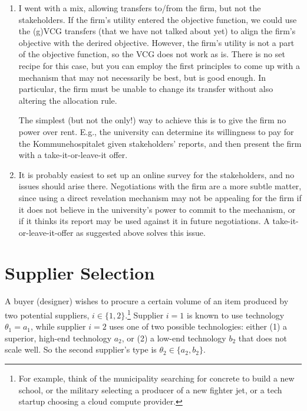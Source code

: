 \documentclass[a4paper]{article}
\begin{document}
\begin{enumerate}
	\item I went with a mix, allowing transfers to/from the firm, but not the stakeholders. If the firm's utility entered the objective function, we could use the (g)VCG transfers (that we have not talked about yet) to align the firm's objective with the derired objective. However, the firm's utility is not a part of the objective function, so the VCG does not work as is. There is no set recipe for this case, but you can employ the first principles to come up with a mechanism that may not necessarily be best, but is good enough. In particular, the firm must be unable to change its transfer without also altering the allocation rule. 
	
	The simplest (but not the only!) way to achieve this is to give the firm no power over rent. E.g., the university can determine its willingness to pay for the Kommunehospitalet given stakeholders' reports, and then present the firm with a take-it-or-leave-it offer.
	
	\item It is probably easiest to set up an online survey for the stakeholders, and no issues should arise there. Negotiations with the firm are a more subtle matter, since using a direct revelation mechanism may not be appealing for the firm if it does not believe in the university's power to commit to the mechanism, or if it thinks its report may be used against it in future negotiations. A take-it-or-leave-it-offer as suggested above solves this issue. 
\end{enumerate}

\fi



\section{Supplier Selection}

A buyer (designer) wishes to procure a certain volume of an item produced by two potential suppliers, $i \in \{1,2\}$.\footnote{For example, think of the municipality searching for concrete to build a new school, or the military selecting a producer of a new fighter jet, or a tech startup choosing a cloud compute provider.} 
Supplier $i=1$ is known to use technology $\theta_1 = a_1$, while supplier $i=2$ uses one of two possible technologies: either (1) a superior, high-end technology $a_2$, or (2) a low-end technology $b_2$ that does not scale well. So the second supplier's type is $\theta_2 \in \{a_2, b_2\}$.
\end{document}
